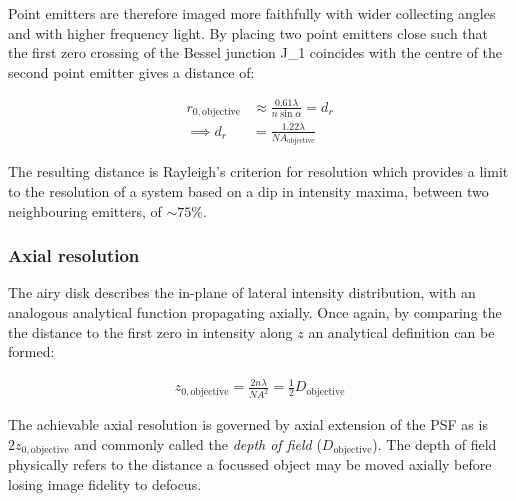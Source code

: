 Point emitters are therefore imaged more faithfully with wider collecting angles and with higher frequency light.
By placing two point emitters close such that the first zero crossing of the Bessel junction \gls{J_1} coincides with the centre of the second point emitter gives a distance of:

\begin{align}
    r_{0,\text{objective}} &\approx \frac{0.61\lambda}{n\sin\alpha} = d_r \label{eq:lateral_res}\\
    \implies d_r &= \frac{1.22 \lambda}{NA_{\text{objective}}}
\end{align}

The resulting distance is Rayleigh's criterion for resolution which provides a limit to the resolution of a system based on a dip in intensity maxima, between two neighbouring emitters, of $\sim 75\%$.

\subsubsection{Axial resolution}

The \Gls{airy disk} describes the in-plane of lateral intensity distribution, with an analogous analytical function propagating axially.
Once again, by comparing the the distance to the first zero in intensity along $z$ an analytical definition can be formed:

\begin{align}
    z_{0,\text{objective}} = \frac{2n\lambda}{{NA}^2} \label{eq:axial_res} = \frac{1}{2} D_{\text{objective}}
\end{align}

The achievable axial resolution is governed by axial extension of the PSF as is $2z_{0,\text{objective}}$ and commonly called the \emph{\gls{depth of field}} ($D_{\text{objective}}$).
The \gls{depth of field} physically refers to the distance a focussed object may be moved axially before losing image fidelity to defocus.


